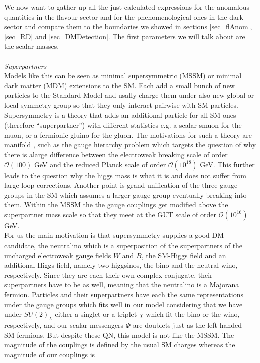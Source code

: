 We now want to gather up all the just calculated expressions for the anomalous quantities in the flavour sector and for the phenomenological ones 
in the dark sector and compare them to the boundaries we showed in sections \ref{sec_flAnom}, \ref{sec_RD} and \ref{sec_DMDetection}. The first
parameters we will talk about are the scalar masses.
\\ \\ \textit{Superpartners}\\
Models like this can be seen as minimal supersymmetric (MSSM) or minimal dark matter (MDM) extensions to the SM. Each add a small bunch of new particles to 
the Standard Model and usally charge them under also new global or local symmetry group so that they only interact pairwise with SM particles. 
Supersymmetry is a theory that adds an additional particle for all SM ones (therefore ``superpartner'') with different statistics 
\cite{9709356} e.g. a scalar smuon for the muon, or a fermionic gluino for the gluon. The motivations for such a theory are manifold 
\cite{1302.6587}, such as the gauge hierarchy problem which targets the question of why there is alarge difference between the electroweak breaking 
scale of order $\mathcal{O}(100)$ GeV and the reduced Planck scale of order $\mathcal{O}(10^{18})$ GeV. This further leads to the question why the
higgs mass is what it is and does not suffer from large loop corrections. Another point is grand unification of the three gauge groups in the SM 
which assumes a larger gauge group eventually breaking into them. Within the MSSM the the gauge couplings get modified above the superpartner mass
scale so that they meet at the GUT scale of order $\mathcal{O}(10^{16})$ GeV. \\
\noindent For us the main motivation is that supersymmetry supplies a good DM
candidate, the neutralino which is a superposition of the superpartners of the uncharged electroweak gauge fields $W$ and $B$, the SM-Higgs field and an 
additional Higgs-field, namely two higgsinos, the bino and the neutral wino, respectively. Since they are each their own complex conjugate,
their superpartners have to be as well, meaning that the neutralino is a Majorana fermion. Particles and their superpartners have each the same 
representations under the gauge groups which fits well in our model considering that we have under $SU(2)_L$ either a singlet or a triplet $\chi$
which fit the bino or the wino, respectively, and our scalar messengers $\Phi$ are doublets just as the left handed SM-fermions. But despite these
QN, this model is not like the MSSM. The magnitude of the couplings is defined by the usual SM charges whereas the magnitude of our couplings is 
